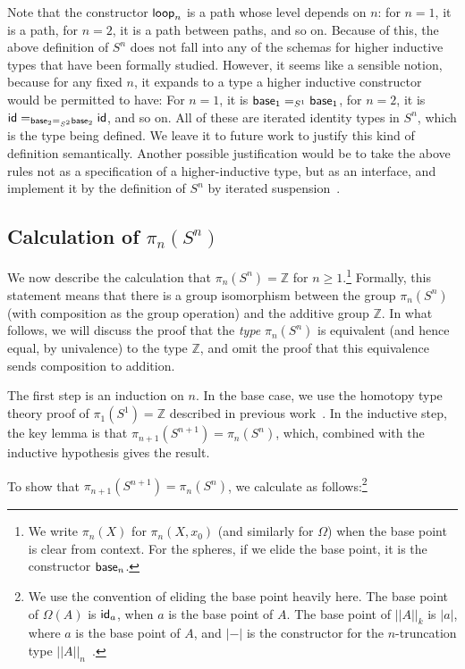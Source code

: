 Note that the constructor $\mathsf{loop}_n$ is a path whose level depends
on $n$: for $n = 1$, it is a path, for $n = 2$, it is a path between
paths, and so on.  Because of this, the above definition of $S^n$ does
not fall into any of the schemas for higher inductive types that have
been formally studied.  However, it seems like a sensible notion,
because for any fixed $n$, it expands to a type a higher inductive
constructor would be permitted to have: For $n = 1$, it is $\mathsf{base}_1
=_{S^1} \mathsf{base}_1$, for $n=2$, it is $\mathsf{id} =_{\mathsf{base}_2 =_{S^2}
  \mathsf{base}_2} \mathsf{id}$, and so on.  All of these are iterated identity
types in $S^n$, which is the type being defined.  We leave it to future
work to justify this kind of definition semantically.  Another
possible justification would be to take the above rules not as a specification of a
higher-inductive type, but as an interface, and implement it by the
 definition of $S^n$ by iterated suspension~\citep[Section 6.5]{uf13hott-book}.  

\subsection{Calculation of $\pi_n(S^n)$}
\label{sec:pinsn}

We now describe the calculation that $\pi_n(S^n) = \mathbb{Z}$ for $n
\ge 1$.\footnote{We
write $\pi_n(X)$ for $\pi_n(X,x_0)$ (and similarly for $\Omega$) when the
base point is clear from context.  For the spheres, if we elide the base
point, it is
the constructor $\mathsf{base}_n$.}  Formally, this statement means
that there is a group isomorphism between the group $\pi_n(S^n)$ (with
composition as the group operation) and the additive group
$\mathbb{Z}$.  In what follows, we will discuss the proof that the
\emph{type} $\pi_n(S^n)$ is equivalent (and hence equal, by univalence) to the
type $\mathbb{Z}$, and omit the proof that this equivalence sends
composition to addition.   

The
first step is an induction on $n$.  In the base case, we use the
homotopy type theory proof of $\pi_1(S^1) = \mathbb{Z}$ described in
previous work~\citep{ls13pi1s1}.  In the inductive step, the key lemma
is that $\pi_{n+1}(S^{n+1}) = \pi_n(S^n)$, which, combined with the
inductive hypothesis gives the result.  

To show that $\pi_{n+1}(S^{n+1}) = \pi_n(S^n)$, we calculate as
follows:\footnote{We use the convention of eliding the base point
  heavily here.  The base point of $\Omega(A)$ is $\mathsf{id}_a$, when
  $a$ is the base point of $A$.  The base point of $||A||_k$ is $|a|$,
  where $a$ is the base point of $A$, and $|-|$ is the constructor for
  the $n$-truncation type $||A||_n$~\citep[Section 7.3]{uf13hott-book}.}

